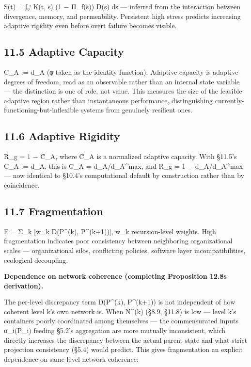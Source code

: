 \documentclass[
]{article}
\begin{document}
S(t) = ∫₀ᵗ K(t, s) (1 − Π\_f(s)) D(s) ds --- inferred from the
interaction between divergence, memory, and permeability. Persistent
high stress predicts increasing adaptive rigidity even before overt
failure becomes visible.

\hypertarget{adaptive-capacity}{%
\subsection{11.5 Adaptive Capacity}\label{adaptive-capacity}}

C\_A := d\_A (φ taken as the identity function). Adaptive capacity is
adaptive degrees of freedom, read as an observable rather than an
internal state variable --- the distinction is one of role, not value.
This measures the size of the feasible adaptive region rather than
instantaneous performance, distinguishing
currently-functioning-but-inflexible systems from genuinely resilient
ones.

\hypertarget{adaptive-rigidity-1}{%
\subsection{11.6 Adaptive Rigidity}\label{adaptive-rigidity-1}}

R\_g = 1 − C̃\_A, where C̃\_A is a normalized adaptive capacity. With
§11.5's C\_A := d\_A, this is C̃\_A = d\_A/d\_A\^{}max, and R\_g = 1 −
d\_A/d\_A\^{}max --- now identical to §10.4's computational default by
construction rather than by coincidence.

\hypertarget{fragmentation}{%
\subsection{11.7 Fragmentation}\label{fragmentation}}

F = Σ\_k {[}w\_k D(P\^{}(k), P\^{}(k+1)){]}, w\_k recursion-level
weights. High fragmentation indicates poor consistency between
neighboring organizational scales --- organizational silos, conflicting
policies, software layer incompatibilities, ecological decoupling.

\textbf{Dependence on network coherence (completing Proposition 12.8s
derivation).}

The per-level discrepancy term D(P\^{}(k), P\^{}(k+1)) is not
independent of how coherent level k's own network is. When N\^{}(k)
(§8.9, §11.8) is low --- level k's containers poorly coordinated among
themselves --- the commensurated inputs σ\_i(P\_i) feeding §5.2's
aggregation are more mutually inconsistent, which directly increases the
discrepancy between the actual parent state and what strict projection
consistency (§5.4) would predict. This gives fragmentation an explicit
dependence on same-level network coherence:
\end{document}
